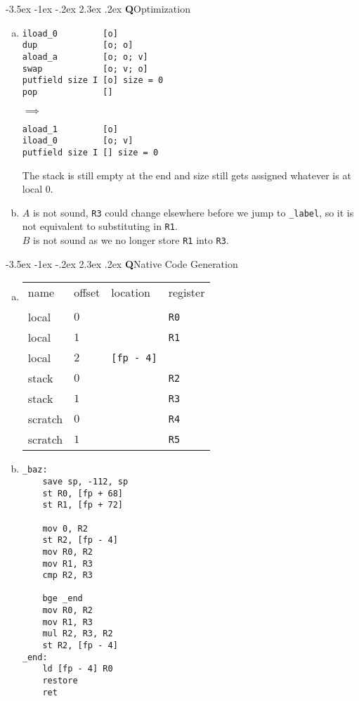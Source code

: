 \documentclass[12pt]{article}
\makeatletter
\renewcommand\section{\@startsection{section}{1}{\z@}%
  {-3.5ex \@plus -1ex \@minus -.2ex}%
                                       {2.3ex \@plus.2ex}%
                                       {\normalfont\bfseries Q}}
\makeatother
\begin{document}
\section{Optimization}
\begin{enumerate}[(a)]
\item
  \begin{minipage}{0.5\linewidth}
\begin{verbatim}
iload_0         [o]
dup             [o; o]
aload_a         [o; o; v]
swap            [o; v; o]
putfield size I [o] size = 0
pop             []
\end{verbatim}
  \end{minipage}
  $\implies$ \hspace{5 em}
  \begin{minipage}{0.5\linewidth}
\begin{verbatim}
aload_1         [o]
iload_0         [o; v]
putfield size I [] size = 0
\end{verbatim}
  \end{minipage}
  The stack is still empty at the end and size still gets assigned
  whatever is at local $0$.

\item $A$ is not sound, \texttt{R3} could change elsewhere before we
  jump to \texttt{\_label}, so it is not equivalent to substituting in \texttt{R1}.
  \\ $B$ is not sound as we no longer store \texttt{R1} into \texttt{R3}.
\end{enumerate}

\section{Native Code Generation}
\begin{enumerate}[(a)]
\item
\begin{tabular}{l l l l}
  name&offset&location&register
  \\
  \\ local & $0$ & & \texttt{R0}
  \\ local & $1$ & & \texttt{R1}
  \\ local & $2$ & \texttt{[fp - 4]}
  \\ stack & $0$ & & \texttt{R2}
  \\ stack & $1$ & & \texttt{R3}
  \\ scratch & $0$ & & \texttt{R4}
  \\ scratch & $1$ & & \texttt{R5}
\end{tabular}
\item
\begin{verbatim}
_baz:
    save sp, -112, sp
    st R0, [fp + 68]
    st R1, [fp + 72]

    mov 0, R2
    st R2, [fp - 4]
    mov R0, R2
    mov R1, R3
    cmp R2, R3

    bge _end
    mov R0, R2
    mov R1, R3
    mul R2, R3, R2
    st R2, [fp - 4]
_end:
    ld [fp - 4] R0
    restore
    ret
\end{verbatim}
\end{enumerate}
\end{document}
